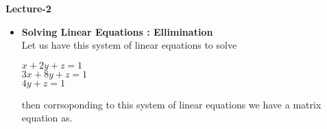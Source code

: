 \documentclass[a4paper,11pt]{article}
\numberwithin{equation}{section}
\begin{document}
    \vspace{1cm}
    \begin{center}
        \Huge{\textbf{Lecture-2}}
    \end{center}
    \vspace{5pt}
    \begin{itemize}         
        \item \textbf{Solving Linear Equations : Ellimination}\\
        Let us have this system of linear equations to solve
        \begin{center}
            $x+2y+z=1$\\
            $3x+8y+z=1$\\
            $4y+z=1$\\
        \end{center}

        then corrsoponding to this system of linear equations we have a matrix equation as.


\end{itemize}
\end{document}
